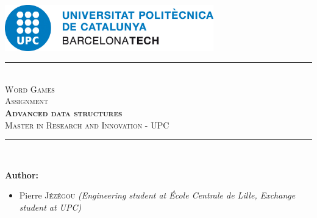 \pagestyle{plain}
\pagecolor{white}


\vfill


\color{black}
\begin{center}
    \includegraphics[height=2cm]{images/logos/upc_logo.jpeg} \\
    \vfill
    
    \vfill
    \rule{\linewidth}{0.5mm} \\[1cm]
    {\Huge \textsc{\textcolor{fib_red}{Word Games}}}\\[1cm]
    {\Large \textsc{Assignment}}\\[0.4cm]
    {\huge \textsc{\textbf{Advanced data structures}}}\\[1cm]
    {\Large \textsc{Master in Research and Innovation - UPC}}\\[0.4cm]
    \rule{\linewidth}{0.5mm} \\[1.5cm]
\end{center}

\vfill

\textbf{Author:}
\begin{itemize}
\item Pierre \textsc{Jézégou}\newline
\textit{(Engineering student at École Centrale de Lille, Exchange student at UPC)}
\end{itemize}

\newpage
\color{black}
\pagecolor{white}
\pagestyle{fancy}